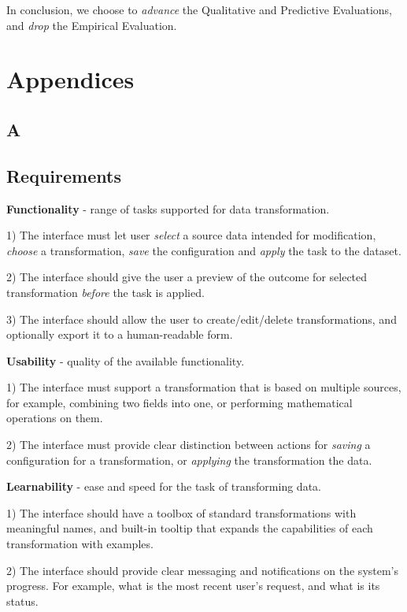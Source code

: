 \documentclass[12pt,letterpaper]{article}
\begin{document}
In conclusion, we choose to \textit{advance} the Qualitative and Predictive Evaluations, and \textit{drop} the Empirical Evaluation.  

 


\newpage
\section*{Appendices}

\appendix


\subsection*{A}
\subsection*{Requirements}

\textbf{Functionality} - range of tasks supported for data transformation.

1) The interface must let user \textit{select} a source data intended for modification, \textit{choose} a transformation, \textit{save} the configuration and \textit{apply} the task to the dataset.

2) The interface should give the user a preview of the outcome for selected transformation \textit{before} the task is applied.

3) The interface should allow the user to create/edit/delete transformations, and optionally export it to a human-readable form.

\textbf{Usability} - quality of the available functionality.

1) The interface must support a transformation that is based on multiple sources, for example, combining two fields into one, or performing mathematical operations on them.

2) The interface must provide clear distinction between actions for \textit{saving} a configuration for a transformation, or \textit{applying} the transformation the data.

\textbf{Learnability} - ease and speed for the task of transforming data.

1) The interface should have a toolbox of standard transformations with meaningful names, and built-in tooltip that expands the capabilities of each transformation with examples.

2) The interface should provide clear messaging and notifications on the system's progress. For example, what is the most recent user's request, and what is its status.
\end{document}
